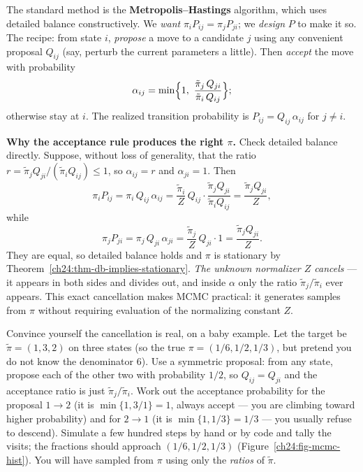 The standard method is the \textbf{Metropolis--Hastings} algorithm, which uses detailed
balance constructively. We \emph{want} $\pi_i P_{ij} = \pi_j P_{ji}$; we
\emph{design} $P$ to make it so. The recipe: from state $i$, \emph{propose} a move
to a candidate $j$ using any convenient proposal $Q_{ij}$ (say, perturb the
current parameters a little). Then \emph{accept} the move with probability
\[
  \alpha_{ij} = \min\set[\Big]{1,\ \frac{\tilde\pi_j\, Q_{ji}}{\tilde\pi_i\, Q_{ij}}};
\]
otherwise stay at $i$. The realized transition probability is
$P_{ij} = Q_{ij}\,\alpha_{ij}$ for $j\neq i$.

\begin{whybox}
\textbf{Why the acceptance rule produces the right $\pi$.} Check detailed balance
directly. Suppose, without loss of generality, that the ratio
$r = \tilde\pi_j Q_{ji} / (\tilde\pi_i Q_{ij}) \le 1$, so $\alpha_{ij} = r$ and
$\alpha_{ji} = 1$. Then
\[
  \pi_i P_{ij} = \pi_i\, Q_{ij}\,\alpha_{ij}
  = \frac{\tilde\pi_i}{Z}\, Q_{ij}\cdot \frac{\tilde\pi_j Q_{ji}}{\tilde\pi_i Q_{ij}}
  = \frac{\tilde\pi_j Q_{ji}}{Z},
\]
while
\[
  \pi_j P_{ji} = \pi_j\, Q_{ji}\,\alpha_{ji}
  = \frac{\tilde\pi_j}{Z}\, Q_{ji}\cdot 1 = \frac{\tilde\pi_j Q_{ji}}{Z}.
\]
They are equal, so detailed balance holds and $\pi$ is stationary by
Theorem~\ref{ch24:thm-db-implies-stationary}. \emph{The unknown normalizer $Z$
cancels} --- it appears in both sides and divides out, and inside $\alpha$ only the
ratio $\tilde\pi_j/\tilde\pi_i$ ever appears. This exact cancellation makes MCMC practical:
it generates samples from $\pi$ without requiring evaluation of the normalizing constant $Z$.
\end{whybox}

\begin{labbox}
Convince yourself the cancellation is real, on a baby example. Let the target be
$\tilde\pi = (1, 3, 2)$ on three states (so the true $\pi = (1/6, 1/2, 1/3)$, but
pretend you do not know the denominator $6$). Use a symmetric proposal: from any
state, propose each of the other two with probability $1/2$, so $Q_{ij}=Q_{ji}$
and the acceptance ratio is just $\tilde\pi_j/\tilde\pi_i$. Work out the
acceptance probability for the proposal $1 \to 2$ (it is
$\min\{1, 3/1\} = 1$, always accept --- you are climbing toward higher
probability) and for $2 \to 1$ (it is $\min\{1, 1/3\} = 1/3$ --- you usually
refuse to descend). Simulate a few hundred steps by hand or by code and tally the
visits; the fractions should approach $(1/6, 1/2, 1/3)$ (Figure~\ref{ch24:fig-mcmc-hist}).
You will have sampled from $\pi$ using only the \emph{ratios} of $\tilde\pi$.
\end{labbox}

